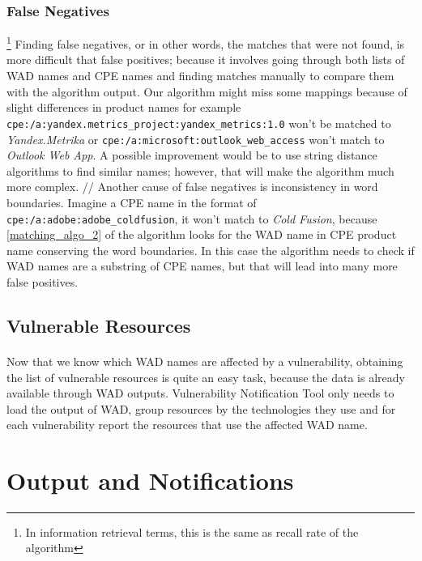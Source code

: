 \subsubsection{False Negatives}\footnote{In information retrieval terms, this is the same as recall rate of the algorithm}
Finding false negatives, or in other words, the matches that were not found, is more difficult that false positives; because it involves going through both lists of WAD names and CPE names and finding matches manually to compare them with the algorithm output. Our algorithm might miss some mappings because of slight differences in product names for example  \texttt{cpe:/a:yandex.metrics\_project:yandex\_metrics:1.0} won't be matched to \textit{Yandex.Metrika} or \texttt{cpe:/a:microsoft:outlook\_web\_access} won't match to \textit{Outlook Web App}. A possible improvement would be to use string distance algorithms to find similar names; however, that will make the algorithm much more complex.
//
Another cause of false negatives is inconsistency in word boundaries. Imagine a CPE name in the format of \texttt{cpe:/a:adobe:adobe\_coldfusion}, it won't match to \textit{Cold Fusion}, because \ref{matching_algo_2} of the algorithm looks for the WAD name in CPE product name conserving the word boundaries. In this case the algorithm needs to check if WAD names are a substring of CPE names, but that will lead into many more false positives.

\subsection{Vulnerable Resources}
\paragraph{}
Now that we know which WAD names are affected by a vulnerability, obtaining the list of vulnerable resources is quite an easy task, because the data is already available through WAD outputs. Vulnerability Notification Tool only needs to load the output of WAD, group resources by the technologies they use and for each vulnerability report the resources that use the affected WAD name.
\section{Output and Notifications}
\paragraph{}


